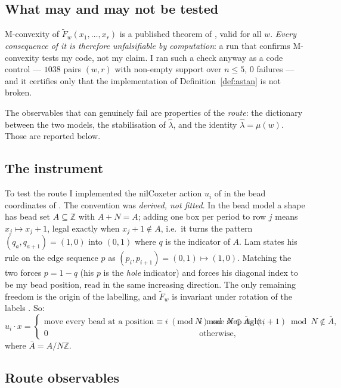 \documentclass[11pt]{article}
\theoremstyle{plain}
\theoremstyle{definition}
\newcommand{\Z}{\mathbb{Z}}
\newcommand{\Fw}{\widetilde{F}_{w}}
\begin{document}
\subsection{What may and may not be tested}

M-convexity of $\Fw(x_1,\dots,x_r)$ is a published theorem of \cite{WZZ}, valid for all $w$.
\emph{Every consequence of it is therefore unfalsifiable by computation}: a run that confirms
M-convexity tests my code, not my claim. I ran such a check anyway as a code control ---
$1038$ pairs $(w,r)$ with non-empty support over $n\le5$, $0$ failures --- and it certifies
only that the implementation of Definition~\ref{def:astan} is not broken.

The observables that can genuinely fail are properties of the \emph{route}: the dictionary
between the two models, the stabilisation of $\hat\lambda$, and the identity
$\hat\lambda=\mu(w)$. Those are reported below.

\subsection{The instrument}

To test the route I implemented the nilCoxeter action $u_i$ of \cite[\S7]{Lam2006} in the bead
coordinates of \cite{Clio2026}. The convention was \emph{derived, not fitted}. In the bead
model a shape has bead set $A\subseteq\Z$ with $A+N=A$; adding one box per period to row $j$
means $x_j\mapsto x_j+1$, legal exactly when $x_j+1\notin A$, i.e.\ it turns the pattern
$(q_a,q_{a+1})=(1,0)$ into $(0,1)$ where $q$ is the indicator of $A$. Lam states his rule on
the edge sequence $p$ as $(p_i,p_{i+1})=(0,1)\mapsto(1,0)$. Matching the two forces $p=1-q$
(his $p$ is the \emph{hole} indicator) and forces his diagonal index to be my bead position,
read in the same increasing direction. The only remaining freedom is the origin of the
labelling, and $\Fw$ is invariant under rotation of the labels
\cite[Prop.\ at l.1113]{Lam2006}. So:
\[
  u_i\cdot x=\begin{cases}
  \text{move every bead at a position}\equiv i\ (\mathrm{mod}\ N)\text{ one step right},
  & i\bmod N\in \bar A,\ (i+1)\bmod N\notin\bar A,\\[2pt]
  0 & \text{otherwise,}\end{cases}
\]
where $\bar A=A/N\Z$.

\subsection{Route observables}
\end{document}
